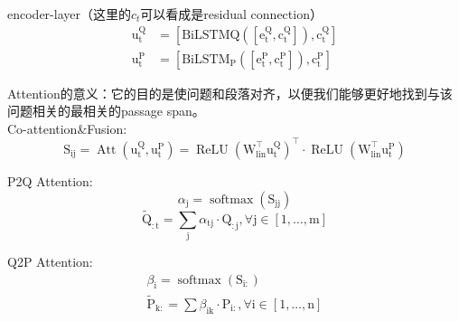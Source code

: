 \documentclass[a4paper,UTF8]{article}
\numberwithin{equation}{section}
\begin{document}
encoder-layer（这里的$c_t$可以看成是residual connection）
\begin{equation}
\begin{aligned} \mathrm{u}_{\mathrm{t}}^{\mathrm{Q}} &=\left[\mathrm{BiLSTMQ}\left(\left[\mathrm{e}_{\mathrm{t}}^{\mathrm{Q}}, \mathrm{c}_{\mathrm{t}}^{\mathrm{Q}}\right]\right), \mathrm{c}_{\mathrm{t}}^{\mathrm{Q}}\right] \\ \mathrm{u}_{\mathrm{t}}^{\mathrm{P}} &=\left[\mathrm{BiLSTM_{P }}\left(\left[\mathrm{e}_{\mathrm{t}}^{\mathrm{P}}, \mathrm{c}_{\mathrm{t}}^{\mathrm{P}}\right]\right), \mathrm{c}_{\mathrm{t}}^{\mathrm{P}}\right] \end{aligned}
\end{equation}

Attention的意义：它的目的是使问题和段落对齐，以便我们能够更好地找到与该问题相关的最相关的passage span。\\

Co-attention\&Fusion:\\
\begin{equation}
	\mathrm{S}_{\mathrm{ij}}=\operatorname{Att}\left(\mathrm{u}_{\mathrm{t}}^{\mathrm{Q}}, \mathrm{u}_{\mathrm{t}}^{\mathrm{P}}\right)=\operatorname{ReLU}\left(\mathrm{W}_{\operatorname{lin}}^{\top} \mathrm{u}_{\mathrm{t}}^{\mathrm{Q}}\right)^{\top} \cdot \operatorname{ReLU}\left(\mathrm{W}_{\operatorname{lin}}^{\top} \mathrm{u}_{\mathrm{t}}^{\mathrm{P}}\right)
	\end{equation}

P2Q Attention:
\begin{equation}
	\alpha_{\mathrm{j}}=\operatorname{softmax}\left(\mathrm{S}_{\mathrm{jj}}\right)
	\end{equation}
	\begin{equation}
		\tilde{\mathrm{Q}}_{ : \mathrm{t}}=\sum_{\mathrm{j}} \alpha_{\mathrm{tj}} \cdot \mathrm{Q}_{ : \mathrm{j}}, \forall \mathrm{j} \in[1, \ldots, \mathrm{m}]
		\end{equation}

Q2P Attention:
\begin{equation}
\begin{array}{c}{\beta_{\mathrm{i}}=\operatorname{softmax}\left(\mathrm{S}_{\mathrm{i} :}\right)} \\ {\tilde{\mathrm{P}}_{\mathrm{k} :}=\sum \beta_{\mathrm{ik}} \cdot \mathrm{P}_{\mathrm{i} :}, \forall \mathrm{i} \in[1, \ldots, \mathrm{n}]}\end{array}
\end{equation}
\end{document}
